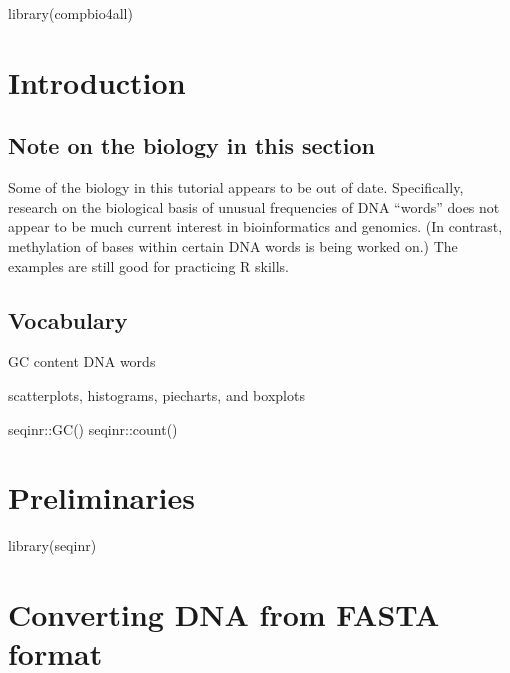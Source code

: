 \documentclass[
]{book}
\newenvironment{Shaded}{\begin{snugshade}}{\end{snugshade}}
\newcommand{\FunctionTok}[1]{\textcolor[rgb]{0.00,0.00,0.00}{#1}}
\newcommand{\NormalTok}[1]{#1}
\begin{document}
\begin{Shaded}
\begin{Highlighting}[]
\FunctionTok{library}\NormalTok{(compbio4all)}
\end{Highlighting}
\end{Shaded}

\hypertarget{introduction}{%
\section{Introduction}\label{introduction}}

\hypertarget{note-on-the-biology-in-this-section}{%
\subsection{Note on the biology in this section}\label{note-on-the-biology-in-this-section}}

Some of the biology in this tutorial appears to be out of date. Specifically, research on the biological basis of unusual frequencies of DNA ``words'' does not appear to be much current interest in bioinformatics and genomics. (In contrast, methylation of bases within certain DNA words is being worked on.) The examples are still good for practicing R skills.

\hypertarget{vocabulary-1}{%
\subsection{Vocabulary}\label{vocabulary-1}}

GC content
DNA words

scatterplots, histograms, piecharts, and boxplots

seqinr::GC()
seqinr::count()

\hypertarget{preliminaries}{%
\section{Preliminaries}\label{preliminaries}}

\begin{Shaded}
\begin{Highlighting}[]
\FunctionTok{library}\NormalTok{(seqinr)}
\end{Highlighting}
\end{Shaded}

\hypertarget{converting-dna-from-fasta-format}{%
\section{Converting DNA from FASTA format}\label{converting-dna-from-fasta-format}}
\end{document}
